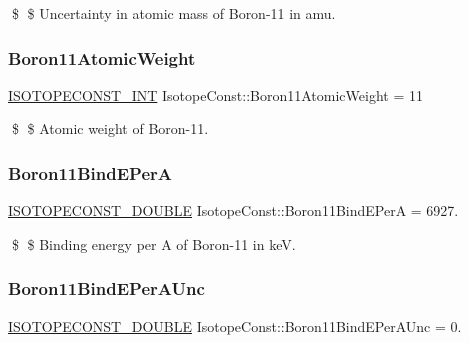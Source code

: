 \$ \$ Uncertainty in atomic mass of Boron-\/11 in amu. \mbox{\label{group___isotope_const-_boron-_b11_ga7fec159eec793dab752925179d31c28f}} 
\subsubsection{\texorpdfstring{Boron11\+Atomic\+Weight}{Boron11AtomicWeight}}
{\footnotesize\ttfamily \mbox{\hyperlink{group___isotope_const-_macros_ga5f18360b3e99483a35c32d789e62621c}{I\+S\+O\+T\+O\+P\+E\+C\+O\+N\+S\+T\+\_\+\+I\+NT}} Isotope\+Const\+::\+Boron11\+Atomic\+Weight = 11}

\$ \$ Atomic weight of Boron-\/11. \mbox{\label{group___isotope_const-_boron-_b11_ga5ba4893d3ad5e8728e445b47213d1412}} 
\subsubsection{\texorpdfstring{Boron11\+Bind\+E\+PerA}{Boron11BindEPerA}}
{\footnotesize\ttfamily \mbox{\hyperlink{group___isotope_const-_macros_ga8f45a7272ce02c0b4c65c44636ed719a}{I\+S\+O\+T\+O\+P\+E\+C\+O\+N\+S\+T\+\_\+\+D\+O\+U\+B\+LE}} Isotope\+Const\+::\+Boron11\+Bind\+E\+PerA = 6927.}

\$ \$ Binding energy per A of Boron-\/11 in keV. \mbox{\label{group___isotope_const-_boron-_b11_gab8ba10f0a638ada230fcf7998f3ba93a}} 
\subsubsection{\texorpdfstring{Boron11\+Bind\+E\+Per\+A\+Unc}{Boron11BindEPerAUnc}}
{\footnotesize\ttfamily \mbox{\hyperlink{group___isotope_const-_macros_ga8f45a7272ce02c0b4c65c44636ed719a}{I\+S\+O\+T\+O\+P\+E\+C\+O\+N\+S\+T\+\_\+\+D\+O\+U\+B\+LE}} Isotope\+Const\+::\+Boron11\+Bind\+E\+Per\+A\+Unc = 0.}

